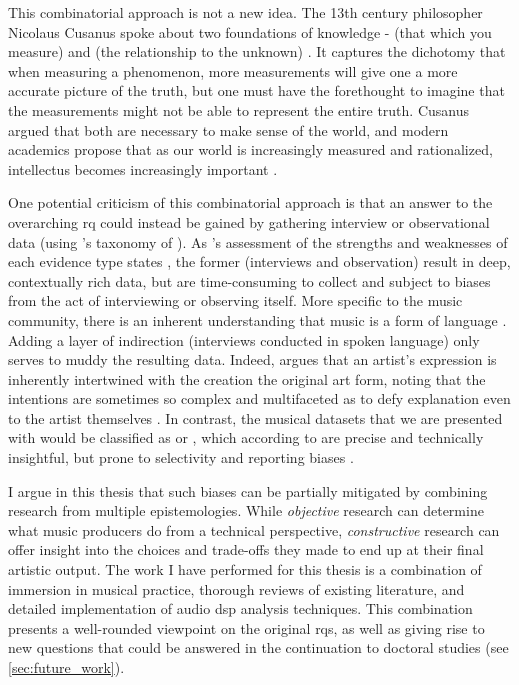 This combinatorial approach is not a new idea. The 13th century philosopher Nicolaus Cusanus spoke about two foundations of knowledge -  (that which you measure) and  (the relationship to the unknown) \cite{millerCusanusNicolausNicolas2025}.  It captures the dichotomy that when measuring a phenomenon, more measurements will give one a more accurate picture of the truth, but one must have the forethought to imagine that the measurements might not be able to represent the entire truth. Cusanus argued that both are necessary to make sense of the world, and modern academics propose that as our world is increasingly measured and rationalized, intellectus becomes increasingly important \cite{hylvingRatioIntellectusConceptual2022}.

One potential criticism of this combinatorial approach is that an answer to the overarching \gls{rq} could instead be gained by gathering interview or observational data (using \citeauthor{yinCaseStudyResearch2014}'s taxonomy of  \cite{yinCaseStudyResearch2014}).  As \citeauthor{grayDoingResearchReal2004}'s assessment of the strengths and weaknesses of each evidence type states \cite{grayDoingResearchReal2004}, the former (interviews and observation) result in deep, contextually rich data, but are time-consuming to collect and subject to biases from the act of interviewing or observing itself. More specific to the music community, there is an inherent understanding that music is a form of language \cite{agawuMusicDiscourseSemiotic2014}. Adding a layer of indirection (interviews conducted in spoken language) only serves to muddy the resulting data. Indeed, \citeauthor{hospersConceptArtisticExpression1954} argues that an artist's expression is inherently intertwined with the creation the original art form, noting that the intentions are sometimes so complex and multifaceted as to defy explanation even to the artist themselves \cite{hospersConceptArtisticExpression1954}. In contrast, the musical datasets that we are presented with would be classified as  or , which according to \citeauthor{grayDoingResearchReal2004} are precise and technically insightful, but prone to selectivity and reporting biases \cite{grayDoingResearchReal2004}. 

I argue in this thesis that such biases can be partially mitigated by combining research from multiple epistemologies. While \textit{objective} research can determine what music producers do from a technical perspective, \textit{constructive} research can offer insight into the choices and trade-offs they made to end up at their final artistic output. The work I have performed for this thesis is a combination of immersion in musical practice, thorough reviews of existing literature, and detailed implementation of audio \gls{dsp} analysis techniques. This combination presents a well-rounded viewpoint on the original \glspl{rq}, as well as giving rise to new questions that could be answered in the continuation to doctoral studies (see \cref{sec:future_work}).
